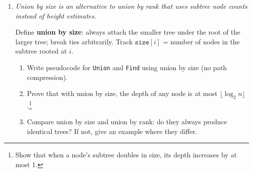 \documentclass[9pt]{book}
\begin{document}
\begin{enumerate}[label=\arabic*.]
Consider running $n-1$ \texttt{Union} operations on $n$ elements using \textbf{naive union} (attach the second tree's root under the first tree's root, regardless of rank), and then $n$ \texttt{Find} operations.

\begin{enumerate}
    \item Give a sequence of $n-1$ \texttt{Union} operations that causes the resulting tree to be a chain (path) of length $n$.
    \item For the chain you constructed, what is the cost of $n$ \texttt{Find} operations on the deepest element?
    \item Now prove that with \textbf{union by rank}, no tree can have height greater than $\lfloor \log_2 n \rfloor$.\footnote{Use induction: show that a tree of rank $k$ must contain at least $2^k$ nodes.}
    \item Conclude that with union by rank (and no path compression), any sequence of $m$ operations on $n$ elements costs $O(m \log n)$ total.
\end{enumerate}

\item \textit{Union by size is an alternative to union by rank that uses subtree node counts instead of height estimates.}

Define \textbf{union by size}: always attach the smaller tree under the root of the larger tree; break ties arbitrarily. Track $\texttt{size}[i]$ = number of nodes in the subtree rooted at $i$.

\begin{enumerate}
    \item Write pseudocode for \texttt{Union} and \texttt{Find} using union by size (no path compression).
    \item Prove that with union by size, the depth of any node is at most $\lfloor \log_2 n \rfloor$.\footnote{Show that when a node's subtree doubles in size, its depth increases by at most 1.}
    \item Compare union by size and union by rank: do they always produce identical trees? If not, give an example where they differ.
\end{enumerate}




\end{enumerate}
\end{document}
